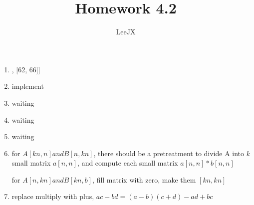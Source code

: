\documentclass{article}
\title{Homework 4.2}
\author{LeeJX}
\begin{document}
\maketitle

\begin{enumerate}[\textbf{4.2}-1]
\item 
\par [[18, 14], [62, 66]]
\item
\par implement
\item
\par
waiting
\item
\par waiting
\item
\par waiting
\item
\par for $A[kn,n] and B[n,kn]$, there should be a pretreatment to divide A into $k$ small matrix $a[n,n]$,
and compute each small matrix $a[n,n]*b[n,n]$
\par for $A[n,kn] and B[kn,b]$, fill matrix with zero, make them $[kn,kn]$
\item
\par replace multiply with plus, $ac - bd = (a-b)(c+d) - ad +bc$
\end{enumerate}
\end{document}
